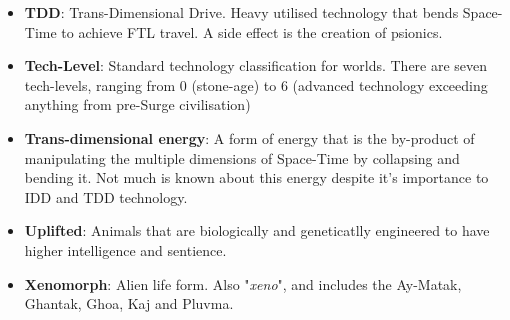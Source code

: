\documentclass[10pt,twoside]{article}
\begin{document}
\begin{multicols}{2}
\begin{itemize}
    \item \textbf{TDD}: Trans-Dimensional Drive. Heavy utilised technology that bends Space-Time to achieve FTL travel. A side effect is the creation of psionics.

    \item \textbf{Tech-Level}: Standard technology classification for worlds. There are seven tech-levels, ranging from 0 (stone-age) to 6 (advanced technology exceeding anything from pre-Surge civilisation)

    \item \textbf{Trans-dimensional energy}: A form of energy that is the by-product of manipulating the multiple dimensions of Space-Time by collapsing and bending it. Not much is known about this energy despite it's importance to IDD and TDD technology.

    \item \textbf{Uplifted}: Animals that are biologically and geneticatlly engineered to have higher intelligence and sentience.

    \item \textbf{Xenomorph}: Alien life form. Also "\textit{xeno}", and includes the Ay-Matak, Ghantak, Ghoa, Kaj and Pluvma.

  \end{itemize}

  \end{multicols}
\end{document}
